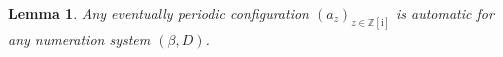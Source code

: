 \documentclass{amsart}
\newcommand{\Z}{\mathbb{Z}}
\newcommand{\tcr}{\textcolor{red}}
\newcommand{\ii}{\mathrm{i}}
\newtheorem*{main theorem}{Theorem \ref{thm:main-gaussian}}
\newtheorem{lemma}[theorem]{Lemma}
\theoremstyle{definition}
\begin{document}
 \begin{lemma}\label{lem:periodic-is-automatic}
  Any eventually periodic configuration $(a_z)_{z\in \Z[\ii]}$ is automatic for any numeration system $(\beta , D)$.  %
\end{lemma}
\end{document}
